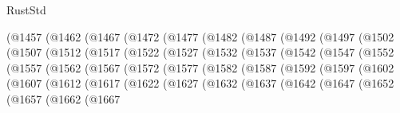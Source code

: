 \begin{lexlean}{RustStd}
\begin{coremodule}
{\begin{coremodule}
{{{{{{{{{{{{            (@1457
              (@1462
                (@1467
                  (@1472
                    (@1477
                      (@1482
                        (@1487
                          (@1492
                            (@1497
                              (@1502
                                (@1507
                                  (@1512
                                    (@1517
                                      (@1522
                                        (@1527
                                          (@1532
                                            (@1537
                                              (@1542
                                                (@1547
                                                  (@1552
                                                    (@1557
                                                      (@1562
                                                        (@1567
                                                          (@1572
                                                            (@1577
                                                              (@1582
                                                                (@1587
                                                                  (@1592
                                                                    (@1597
                                                                      (@1602
                                                                        (@1607
                                                                          (@1612
                                                                            (@1617
                                                                              (@1622
                                                                                (@1627
                                                                                  (@1632
                                                                                    (@1637
                                                                                      (@1642
                                                                                        (@1647
                                                                                          (@1652
                                                                                            (@1657
                                                                                              (@1662
                                                                                                (@1667
}}}}}}}}}}}}
\end{coremodule}}
\end{coremodule}
\end{lexlean}
